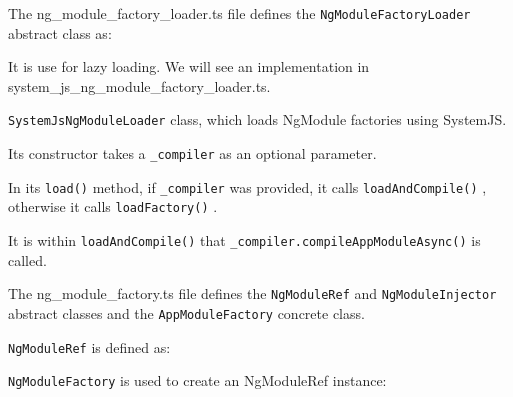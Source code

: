 The ng\_module\_factory\_loader.ts file defines the
\texttt{NgModuleFactoryLoader}
abstract
class as:



It is use for lazy loading. We will see an implementation in
system\_js\_ng\_module\_factory\_loader.ts.

\texttt{SystemJsNgModuleLoader}
class, which loads NgModule factories using SystemJS.



Its constructor takes a
\texttt{\_compiler}
as an optional parameter.



In its
\texttt{load()}
method, if
\texttt{\_compiler}
was provided, it calls
\texttt{loadAndCompile()}
,
otherwise it calls
\texttt{loadFactory()}
.



It is within
\texttt{loadAndCompile()}
that
\texttt{\_compiler.compileAppModuleAsync()}
is called.



The ng\_module\_factory.ts file defines the
\texttt{NgModuleRef}
and
\texttt{NgModuleInjector}
abstract classes and the
\texttt{AppModuleFactory}
concrete class.

\texttt{NgModuleRef}
is defined as:



\texttt{NgModuleFactory}
is used to create an NgModuleRef instance:


